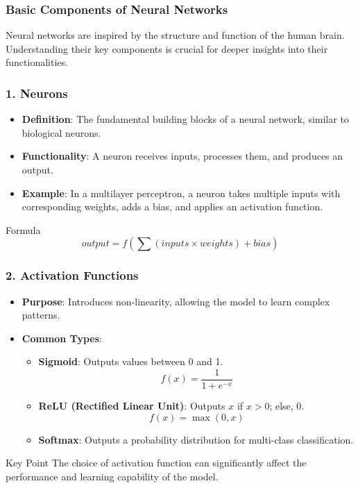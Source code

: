 \documentclass[aspectratio=169]{beamer}
\begin{document}
\begin{frame}[fragile]
    \frametitle{Basic Components of Neural Networks}
    Neural networks are inspired by the structure and function of the human brain. Understanding their key components is crucial for deeper insights into their functionalities.
\end{frame}

\begin{frame}[fragile]
    \frametitle{1. Neurons}
    \begin{itemize}
        \item \textbf{Definition}: The fundamental building blocks of a neural network, similar to biological neurons.
        \item \textbf{Functionality}: A neuron receives inputs, processes them, and produces an output.
        \item \textbf{Example}: 
        In a multilayer perceptron, a neuron takes multiple inputs with corresponding weights, adds a bias, and applies an activation function.
    \end{itemize}
    \begin{block}{Formula}
        \begin{equation}
        output = f\left(\sum (inputs \times weights) + bias\right)
        \end{equation}
    \end{block}
\end{frame}

\begin{frame}[fragile]
    \frametitle{2. Activation Functions}
    \begin{itemize}
        \item \textbf{Purpose}: Introduces non-linearity, allowing the model to learn complex patterns.
        \item \textbf{Common Types}:
            \begin{itemize}
                \item \textbf{Sigmoid}: Outputs values between 0 and 1. 
                  \[
                  f(x) = \frac{1}{1 + e^{-x}}
                  \]
                \item \textbf{ReLU (Rectified Linear Unit)}: Outputs \(x\) if \(x > 0\); else, 0. 
                  \[
                  f(x) = \max(0, x)
                  \]
                \item \textbf{Softmax}: Outputs a probability distribution for multi-class classification.
            \end{itemize}
    \end{itemize}
    \begin{block}{Key Point}
        The choice of activation function can significantly affect the performance and learning capability of the model.
    \end{block}
\end{frame}
\end{document}
